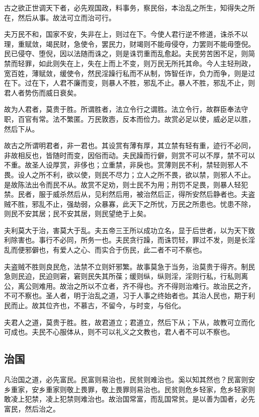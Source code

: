 \documentclass[]{article}
\begin{document}
古之欲正世调天下者，必先观国政，料事务，察民俗，本治乱之所生，知得失之所在，然后从事。故法可立而治可行。

夫万民不和，国家不安，失非在上，则过在下。今使人君行逆不修道，诛杀不以理，重赋敛，竭民财，急使令，罢民力，财竭则不能毋侵夺，力罢则不能毋堕倪。民已侵夺、堕倪，因以法随而诛之，则是诛罚重而乱愈起。夫民劳苦困不足，则简禁而轻罪，如此则失在上，失在上而上不变，则万民无所托其命。今人主轻刑政，宽百姓，薄赋敛，缓使令，然民淫躁行私而不从制，饰智任诈，负力而争，则是过在下。过在下，人君不廉而变，则暴人不胜，邪乱不止。暴人不胜，邪乱不止，则君人者势伤而威日衰矣。

故为人君者，莫贵于胜。所谓胜者，法立令行之谓胜。法立令行，故群臣奉法守职，百官有常。法不繁匿。万民敦悫，反本而俭力。故赏必足以使，威必足以胜，然后下从。

故古之所谓明君者，非一君也。其设赏有薄有厚，其立禁有轻有重，迹行不必同，非故相反也，皆随时而变，因俗而动。夫民躁而行僻，则赏不可以不厚，禁不可以不重。故圣人设厚赏，非侈也；立重禁，非戾也。赏薄则民不利，禁轻则邪人不畏。设人之所不利，欲以使，则民不尽力；立人之所不畏，欲以禁，则邪人不止。是故陈法出令而民不从。故赏不足劝，则士民不为用；刑罚不足畏，则暴人轻犯禁。民者，服于威杀然后从，见利然后用，被治然后正，得所安然后静者也。夫盗贼不胜，邪乱不止，强劫弱，众暴寡，此天下之所忧，万民之所患也。忧患不除，则民不安其居；民不安其居，则民望绝于上矣。

夫利莫大于治，害莫大于乱。夫五帝三王所以成功立名，显于后世者，以为天下致利除害也。事行不必同，所务一也。夫民贪行躁，而诛罚轻，罪过不发，则是长淫乱而便邪僻也，有爱人之心、而实合于伤民，此二者不可不察也。

夫盗贼不胜则良民危，法禁不立则奸邪繁。故事莫急于当务，治莫贵于得齐。制民急则民迫，民迫则窘，窘则民失其所葆；缓则纵，纵则淫，淫则行私，行私则离公，离公则难用。故治之所以不立者，齐不得也。齐不得则治难行。故治民之齐，不可不察也。圣人者，明于治乱之道，习于人事之终始者也。其治人民也，期于利民而止。故其位齐也，不慕古，不留今，与时变，与俗化。

夫君人之道，莫贵于胜。胜，故君道立；君道立，然后下从；下从，故教可立而化可成也。夫民不心服体从，则不可以礼义之文教也，君人者不可以不察也。

\hypertarget{header-n619}{%
\subsection{治国}\label{header-n619}}

凡治国之道，必先富民。民富则易治也，民贫则难治也。奚以知其然也？民富则安乡重家，安乡重家则敬上畏罪，敬上畏罪则易治也。民贫则危乡轻家，危乡轻家则敢凌上犯禁，凌上犯禁则难治也。故治国常富，而乱国常贫。是以善为国者，必先富民，然后治之。
\end{document}

